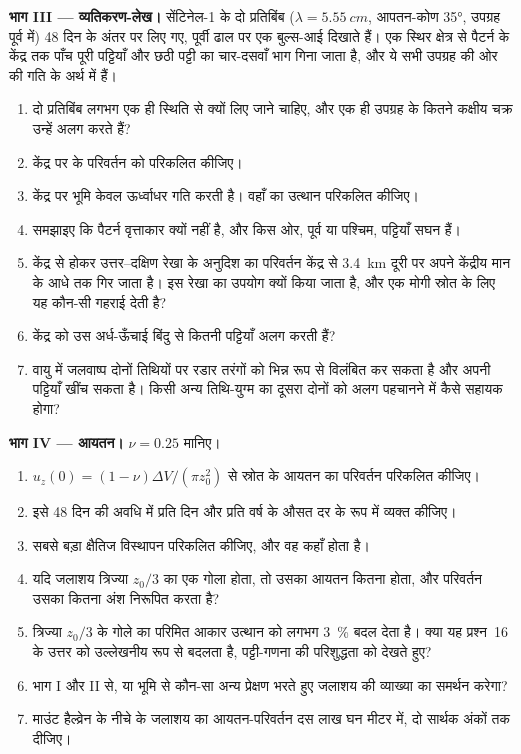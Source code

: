 \begin{problem}
\medskip\noindent\textbf{भाग III --- व्यतिकरण-लेख।} सेंटिनेल-1 के दो
प्रतिबिंब ($\lambda = \qty{5.55}{cm}$, आपतन-कोण \ang{35}, उपग्रह पूर्व में)
48 दिन के अंतर पर लिए गए, पूर्वी ढाल पर एक बुल्स-आई दिखाते हैं।
एक स्थिर क्षेत्र से पैटर्न के केंद्र तक पाँच पूरी पट्टियाँ और
छठी पट्टी का चार-दसवाँ भाग गिना जाता है, और ये सभी उपग्रह की ओर की
गति के अर्थ में हैं।
\begin{enumerate}[resume]
\item दो प्रतिबिंब लगभग एक ही स्थिति से क्यों लिए जाने चाहिए, और एक ही
  उपग्रह के कितने कक्षीय चक्र उन्हें अलग करते हैं?
\item केंद्र पर  के परिवर्तन को परिकलित कीजिए।
\item केंद्र पर भूमि केवल ऊर्ध्वाधर गति करती है। वहाँ का उत्थान
  परिकलित कीजिए।
\item समझाइए कि पैटर्न वृत्ताकार क्यों नहीं है, और किस ओर, पूर्व या
  पश्चिम, पट्टियाँ सघन हैं।
\item केंद्र से होकर उत्तर--दक्षिण रेखा के अनुदिश  का परिवर्तन
  केंद्र से \qty{3.4}{km} दूरी पर अपने केंद्रीय मान के आधे तक गिर जाता है।
  इस रेखा का उपयोग क्यों किया जाता है, और एक मोगी
  स्रोत के लिए यह कौन-सी गहराई देती है?
\item केंद्र को उस अर्ध-ऊँचाई बिंदु से कितनी पट्टियाँ अलग करती हैं?
\item वायु में जलवाष्प दोनों तिथियों पर रडार तरंगों को भिन्न रूप से
  विलंबित कर सकता है और अपनी पट्टियाँ खींच सकता है। किसी अन्य तिथि-युग्म का
  दूसरा  दोनों को अलग पहचानने में कैसे सहायक होगा?
\end{enumerate}

\medskip\noindent\textbf{भाग IV --- आयतन।} $\nu = 0.25$ मानिए।
\begin{enumerate}[resume]
\item $u_z(0) = (1 - \nu)\Delta V/(\pi z_0^2)$ से स्रोत के आयतन का
  परिवर्तन परिकलित कीजिए।
\item इसे 48 दिन की अवधि में प्रति दिन और प्रति वर्ष के औसत दर के रूप में व्यक्त कीजिए।
\item सबसे बड़ा क्षैतिज विस्थापन परिकलित कीजिए, और वह कहाँ होता है।
\item यदि जलाशय त्रिज्या $z_0/3$ का एक गोला होता, तो उसका
  आयतन कितना होता, और परिवर्तन उसका कितना अंश निरूपित करता है?
\item त्रिज्या $z_0/3$ के गोले का परिमित आकार उत्थान को
  लगभग \qty{3}{\percent} बदल देता है। क्या यह प्रश्न~16 के उत्तर को
  उल्लेखनीय रूप से बदलता है, पट्टी-गणना की परिशुद्धता को देखते हुए?
\item भाग I और II से, या भूमि से कौन-सा अन्य प्रेक्षण
  भरते हुए जलाशय की व्याख्या का समर्थन करेगा?
\item माउंट हैल्व्रेन के नीचे के जलाशय का आयतन-परिवर्तन दस लाख घन मीटर में,
  दो सार्थक अंकों तक दीजिए।
\end{enumerate}
\end{problem}
